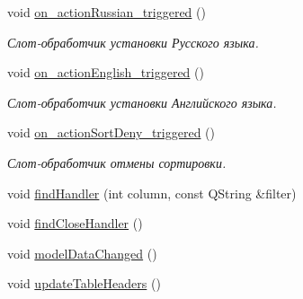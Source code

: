 \begin{DoxyCompactItemize}
\mbox{\label{class_main_window_a18dc92671afbb0c795b3a54fccffe101}} 
void \mbox{\hyperlink{class_main_window_a18dc92671afbb0c795b3a54fccffe101}{on\+\_\+action\+Russian\+\_\+triggered}} ()
\begin{DoxyCompactList}\small\item\em Слот-\/обработчик установки Русского языка. \end{DoxyCompactList}\item 
\mbox{\label{class_main_window_ae36ab7fab3dc85d49dcec92da04c4f42}} 
void \mbox{\hyperlink{class_main_window_ae36ab7fab3dc85d49dcec92da04c4f42}{on\+\_\+action\+English\+\_\+triggered}} ()
\begin{DoxyCompactList}\small\item\em Слот-\/обработчик установки Английского языка. \end{DoxyCompactList}\item 
\mbox{\label{class_main_window_a87dfb7f34a42c66867ca6e002fedd190}} 
void \mbox{\hyperlink{class_main_window_a87dfb7f34a42c66867ca6e002fedd190}{on\+\_\+action\+Sort\+Deny\+\_\+triggered}} ()
\begin{DoxyCompactList}\small\item\em Слот-\/обработчик отмены сортировки. \end{DoxyCompactList}\item 
void \mbox{\hyperlink{class_main_window_a3db67e0fc35329311fdc19a52988bdd0}{find\+Handler}} (int column, const Q\+String \&filter)
\item 
void \mbox{\hyperlink{class_main_window_a7245b2b62e72712644389e626ecc43a6}{find\+Close\+Handler}} ()
\item 
void \mbox{\hyperlink{class_main_window_a9ce11039afd283f8f793e8c44a08f3c9}{model\+Data\+Changed}} ()
\item 
void \mbox{\hyperlink{class_main_window_ae1afb0606286fe6cb05155b0d120ef17}{update\+Table\+Headers}} ()
\end{DoxyCompactItemize}
